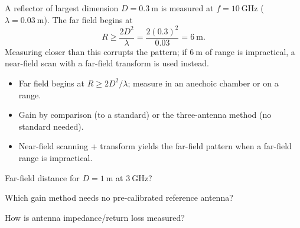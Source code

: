 \begin{workedexample}
A reflector of largest dimension $D = 0.3\ \text{m}$ is measured at
$f = 10\ \text{GHz}$ ($\lambda = 0.03\ \text{m}$). The far field begins at
\[ R \ge \frac{2D^2}{\lambda} = \frac{2(0.3)^2}{0.03} = 6\ \text{m}. \]
Measuring closer than this corrupts the pattern; if $6\ \text{m}$ of range is
impractical, a near-field scan with a far-field transform is used instead.
\end{workedexample}

\begin{keytakeaways}
\begin{itemize}[leftmargin=1.4em,itemsep=2pt]
\item Far field begins at $R \ge 2D^2/\lambda$; measure in an anechoic chamber or on a range.
\item Gain by comparison (to a standard) or the three-antenna method (no standard needed).
\item Near-field scanning + transform yields the far-field pattern when a far-field range is impractical.
\end{itemize}
\end{keytakeaways}

\begin{exercises}
\item Far-field distance for $D = 1\ \text{m}$ at $3\ \text{GHz}$?
\item Which gain method needs no pre-calibrated reference antenna?
\item How is antenna impedance/return loss measured?
\end{exercises}

